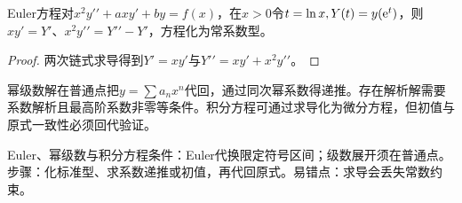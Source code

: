 \begin{theorem}{Euler方程}对$x^2y\prime\prime+axy\prime+by=f(x)$，在$x>0$令$t=\ln x,Y(t)=y(\mathrm{e}^t)$，则$xy\prime=Y\prime$、$x^2y\prime\prime=Y\prime\prime-Y\prime$，方程化为常系数型。\end{theorem}
\begin{proof}两次链式求导得到$Y\prime=xy\prime$与$Y\prime\prime=xy\prime+x^2y\prime\prime$。\end{proof}
\begin{extension}幂级数解在普通点把$y=\sum a_nx^n$代回，通过同次幂系数得递推。存在解析解需要系数解析且最高阶系数非零等条件。积分方程可通过求导化为微分方程，但初值与原式一致性必须回代验证。\end{extension}

\begin{method}{Euler、幂级数与积分方程}条件：Euler代换限定符号区间；级数展开须在普通点。步骤：化标准型、求系数递推或初值，再代回原式。易错点：求导会丢失常数约束。\end{method}

